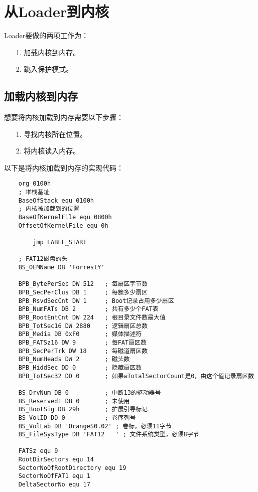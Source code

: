 \documentclass[a4paper,left=2.5cm,right=2.5cm,11pt]{article}
\begin{document}
\tableofcontents

\clearpage

\section{从Loader到内核}
	Loader要做的两项工作为：
	\begin{itemize}
		\item[1.] 加载内核到内存。
		\item[2.] 跳入保护模式。
	\end{itemize}

\subsection{加载内核到内存}
	想要将内核加载到内存需要以下步骤：
	\begin{itemize}
		\item[1.] 寻找内核所在位置。
		\item[2.] 将内核读入内存。
	\end{itemize}

	以下是将内核加载到内存的实现代码：
	\begin{lstlisting}
	org 0100h
	; 堆栈基址
	BaseOfStack equ 0100h
	; 内核被加载到的位置
	BaseOfKernelFile equ 0800h
	OffsetOfKernelFile equ 0h

		jmp LABEL_START

	; FAT12磁盘的头
	BS_OEMName DB 'ForrestY'

	BPB_BytePerSec DW 512 	; 每扇区字节数
	BPB_SecPerClus DB 1   	; 每簇多少扇区 
	BPB_RsvdSecCnt DW 1		; Boot记录占用多少扇区
	BPB_NumFATs DB 2		; 共有多少个FAT表
	BPB_RootEntCnt DW 224	; 根目录文件数最大值
	BPB_TotSec16 DW 2880	; 逻辑扇区总数
	BPB_Media DB 0xF0		; 媒体描述符
	BPB_FATSz16	DW 9		; 每FAT扇区数
	BPB_SecPerTrk DW 18		; 每磁道扇区数
	BPB_NumHeads DW 2		; 磁头数
	BPB_HiddSec DD 0 		; 隐藏扇区数
	BPB_TotSec32 DD 0		; 如果wTotalSectorCount是0，由这个值记录扇区数

	BS_DrvNum DB 0			; 中断13的驱动器号
	BS_Reserved1 DB 0		; 未使用
	BS_BootSig DB 29h		; 扩展引导标记
	BS_VolID DD 0			; 卷序列号
	BS_VolLab DB 'OrangeS0.02' ; 卷标，必须11字节
	BS_FileSysType DB 'FAT12   ' ; 文件系统类型，必须8字节

	FATSz equ 9
	RootDirSectors equ 14
	SectorNoOfRootDirectory equ 19
	SectorNoOfFAT1 equ 1
	DeltaSectorNo equ 17
	\end{lstlisting}
\end{document}
